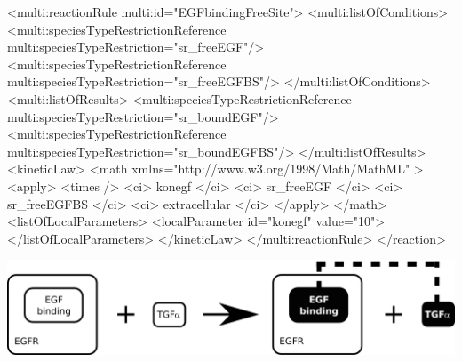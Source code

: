 \begin{example}
        <multi:reactionRule multi:id="EGFbindingFreeSite">
          <multi:listOfConditions>
            <multi:speciesTypeRestrictionReference multi:speciesTypeRestriction="sr_freeEGF"/>
            <multi:speciesTypeRestrictionReference multi:speciesTypeRestriction="sr_freeEGFBS"/>
          </multi:listOfConditions>
          <multi:listOfResults>
            <multi:speciesTypeRestrictionReference multi:speciesTypeRestriction="sr_boundEGF"/>
            <multi:speciesTypeRestrictionReference multi:speciesTypeRestriction="sr_boundEGFBS"/>
          </multi:listOfResults>
            <kineticLaw>
              <math xmlns="http://www.w3.org/1998/Math/MathML" >
                <apply>
                  <times />
                  <ci> konegf </ci>
                  <ci> sr_freeEGF </ci>
                  <ci> sr_freeEGFBS </ci>
                  <ci> extracellular </ci>
                </apply>
              </math>
              <listOfLocalParameters>
                <localParameter id="konegf" value="10">
              </listOfLocalParameters>
            </kineticLaw>
          </multi:reactionRule>
      </reaction>
\end{example}

\includegraphics[scale=0.9]{figs/pngs/TGFbinding.png}

